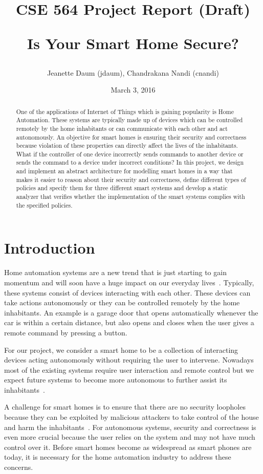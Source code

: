 \documentclass{article}
\title{\textbf{CSE 564 Project Report (Draft)} 
\\
\begin{center}
\LARGE{Is Your Smart Home Secure?}
\end{center}\vspace{-2ex}}
\author{Jeanette Daum (jdaum), Chandrakana Nandi (cnandi) }
\date{March 3, 2016}
\begin{document}
\maketitle
\begin{abstract}
One of the applications of Internet of Things which is gaining popularity is Home Automation. These systems are typically made up of devices which can be controlled remotely by the home inhabitants or can communicate with each other and act autonomously. An objective for smart homes is ensuring their security and correctness because violation of these properties can directly affect the lives of the inhabitants. What if the controller of one device incorrectly sends commands to another device or sends the command to a device under incorrect conditions? In this project, we design and implement an abstract architecture for modelling smart homes in a way that makes it easier to reason about their security and correctness, define different types of policies and specify them for three different smart systems and develop a static analyzer that verifies whether the implementation of the smart systems complies with the specified policies. 

\end{abstract}
\section{Introduction}
Home automation systems are a new trend that is just starting to gain momentum and will soon have a huge impact on our everyday lives~\cite{samsung, homekit, echo, wink, homeos}. Typically, these systems consist of devices interacting with each other. These devices can take actions autonomously or they can be controlled remotely by the home inhabitants. An example is a garage door that opens automatically whenever the car is within a certain distance, but also opens and closes when the user gives a remote command by pressing a button. 

For our project, we consider a smart home to be a collection of interacting devices acting autonomously without requiring the user to intervene. Nowadays most of the existing systems require user interaction and remote control but we expect future systems to become more autonomous to further assist its inhabitants~\cite{homekit}.

A challenge for smart homes is to ensure that there are no security loopholes because they can be exploited by malicious attackers to take control of the house and harm the inhabitants~\cite{yoshi, jung}. For autonomous systems, security and correctness is even more crucial because the user relies on the system and may not have much control over it. Before smart homes become as widespread as smart phones are today, it is necessary for the home automation industry to address these concerns.
\end{document}
